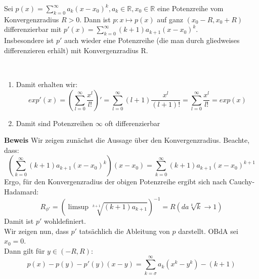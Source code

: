 \setcounter{Satz}{6} 
\begin{Satz}{
	Sei $p \left( x\right) = \sum_{k=0}^{ \infty}
	{ a_k \left( x-x_0\right)^k}, a_k \in 
	\mathbb{R} ,x_0 \in \mathbb{R}$ eine Potenzreihe vom Konvergenzradius 
	$R >0 $. Dann ist $p : x \mapsto p\left(x\right)$ auf ganz 
	$\left( x_0-R, x_0+R \right)$ differenzierbar mit 
	$p'\left( x \right) = \sum_{k=0}^\infty {\left( k+1\right) 
	a_{k+1} \left(x-x_0\right)^k}$.\\
	Insbesondere ist $p'$ auch wieder eine Potenzreihe 
	(die man durch gliedweises differenzieren erhält) mit	Konvergenzradius R.
}\end{Satz}

\begin{Bemerkung}{
	\textbf{ }\\
	\begin{enumerate}
		\item Damit erhalten wir: 
		\begin{equation*}
			exp'\left(x\right) = \left( \sum_{l=0}^{\infty} \frac{x^l}{l!}\right)' 
			= \sum_{l=0}^{\infty} \left(l+1\right) \frac{x^l}{(l+1)!} 
			= \sum_{l=0}^{\infty} \frac{x^l}{l!} = exp(x)
		\end{equation*}
		\item Damit sind Potenzreihen $\infty$ oft differenzierbar
	\end{enumerate}
	\textbf{Beweis} Wir zeigen zunächst die Aussage über den Konvergenzradius. 
	Beachte, dass: 
	\begin{equation*}
		\left(\sum_{k=0}^{\infty} \left( k+1 \right) a_{k+1} \left( x -x_0 \right)^k \right)
		\left(x-x_0\right) = \sum_{k=0}^{\infty} \left(k+1\right) 
		a_{k+1} \left(x-x_0\right)^{k+1}
	\end{equation*}
	Ergo, für den Konvergenzradius der obigen Potenzreihe ergibt sich nach Cauchy-
	Hadamard:
	\begin{equation*}
		R_{\phi'} = \left(\limsup \sqrt[k+1]{\left(k+1\right)a_{k+1}}\right)^{-1}
		= R \left(\textit{da} \sqrt[k]{k} \rightarrow 1\right)
	\end{equation*}
	Damit ist $p'$ wohldefiniert.\\
	 Wir zeigen nun, dass $p'$ tatsächlich die Ableitung von $p$ darstellt. 
	 OBdA sei $x_0 = 0$. \\
	Dann gilt für $y \in \left(-R,R\right)$:
	\begin{equation*}
		p\left(x\right)-p\left(y\right) - p'\left(y\right)\left(x-y\right) 
		= \sum_{k= \sigma}^{\infty} a_k \left(x^k -y^k\right) - \left(k+1\right) 

\end{equation*}}
\end{Bemerkung}
